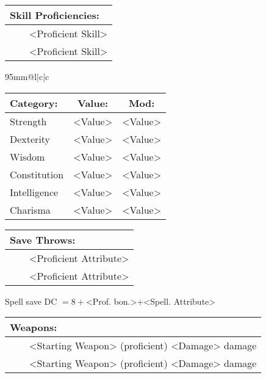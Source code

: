 \documentclass[11pt]{article}
\newcommand{\tabitem}{~~\llap{--}~~}
\begin{document}
\begin{multicols}{2}
\vspace{2mm}

\noindent \begin{tabularx}{95mm}{@{}l}
{\Large \textbf{Skill Proficiencies:}} \\
\hline
\tabitem <Proficient Skill> \\
\tabitem <Proficient Skill>
		\end{tabularx}

\vspace{4mm}

\noindent \begin{tabularx}{95mm}{@{}l|c|c}
 \\
\hline
		\end{tabularx}
\noindent \begin{tabular}{@{}l|c|c}
\textbf{Category:} 			& \textbf{Value:} 	& \textbf{Mod:} \\
\hline
Strength 					& <Value> 				& <Value>		\\
Dexterity 					& <Value> 				& <Value>		\\
Wisdom 						& <Value>				& <Value>		\\
Constitution 				& <Value> 				& <Value>		\\
Intelligence 				& <Value> 				& <Value>		\\
Charisma 					& <Value> 				& <Value>
		\end{tabular}

\vspace{4mm}

\noindent \begin{tabularx}{95mm}{@{}l}
{\Large \textbf{Save Throws:}} \\
\hline
\tabitem <Proficient Attribute> \\
\tabitem <Proficient Attribute> \\
		\end{tabularx}
\noindent Spell save DC $= 8 + $<Prof. bon.>$ + $<Spell. Attribute>

\vspace{4mm}

\noindent \begin{tabularx}{95mm}{@{}l}
{\Large \textbf{Weapons:}} \\
\hline
\tabitem <Starting Weapon> (proficient) <Damage> damage \\
\tabitem <Starting Weapon> (proficient) <Damage> damage
		\end{tabularx}


\end{multicols}
\end{document}

